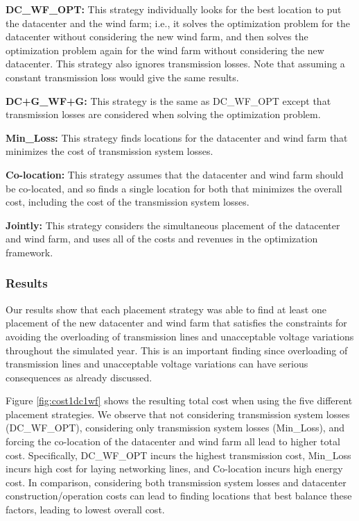 \textbf{DC\_WF\_OPT:} This strategy individually looks for the best
location to put the datacenter and the wind farm; i.e., it solves the
optimization problem for the datacenter without considering the new
wind farm, and then solves the optimization problem again for the wind
farm without considering the new datacenter.  This strategy also
ignores transmission losses.  Note that assuming
a constant transmission loss would give the same results.

\textbf{DC+G\_WF+G:} This strategy is the same as DC\_WF\_OPT except
that transmission losses are considered when solving the optimization
problem.

\textbf{Min\_Loss:} This strategy finds locations for the datacenter
and wind farm that minimizes the cost of transmission system losses.

\textbf{Co-location:} This strategy assumes that the datacenter and
wind farm should be co-located, and so finds a single location for
both that minimizes the overall cost, including the cost of
the transmission system losses.

\textbf{Jointly:} This strategy considers the simultaneous placement
of the datacenter and wind farm, and uses all of the costs and
revenues in the optimization framework.

\subsubsection{Results}

Our results show that each placement strategy was able to find at
least one placement of the new datacenter and wind farm that satisfies
the constraints for avoiding the overloading of transmission lines and
unacceptable voltage variations throughout the simulated year.  This
is an important finding since overloading of transmission lines and
unacceptable voltage variations can have serious consequences as
already discussed.

Figure \ref{fig:cost1dc1wf} shows the resulting total cost when using
the five different placement strategies.  We observe that not
considering transmission system losses (DC\_WF\_OPT), considering only
transmission system losses (Min\_Loss), and forcing the co-location of
the datacenter and wind farm all lead to higher total cost.
Specifically, DC\_WF\_OPT incurs the highest transmission cost,
Min\_Loss incurs high cost for laying networking lines, and
Co-location incurs high energy cost.  In comparison, considering both
transmission system losses and datacenter construction/operation costs
can lead to finding locations that best balance these factors, leading
to lowest overall cost.

